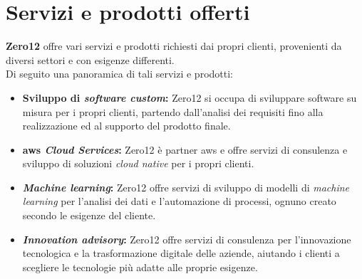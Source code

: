 \section{Servizi e prodotti offerti}
\label{sez:servizi-prodotti-offerti}

\textbf{Zero12} offre vari servizi e prodotti richiesti dai propri clienti, provenienti da diversi settori e con esigenze differenti.\\
Di seguito una panoramica di tali servizi e prodotti:

\begin{itemize}
    \item \textbf{Sviluppo di \textit{software custom}:} Zero12 si occupa di sviluppare software su misura per i propri clienti, partendo dall'analisi dei requisiti fino alla realizzazione ed al supporto del prodotto finale.\\
    \item \textbf{\gls{aws} \textit{Cloud Services}:} Zero12 è partner \gls{aws} e offre servizi di consulenza e sviluppo di soluzioni \textit{cloud native} per i propri clienti.\\
    \item \textbf{\textit{Machine learning}:} Zero12 offre servizi di sviluppo di modelli di \textit{machine learning} per l'analisi dei dati e l'automazione di processi, ognuno creato secondo le esigenze del cliente.\\
    \item \textbf{\textit{Innovation advisory}:} Zero12 offre servizi di consulenza per l'innovazione tecnologica e la trasformazione digitale delle aziende, aiutando i clienti a scegliere le tecnologie più adatte alle proprie esigenze.\\
\end{itemize}

